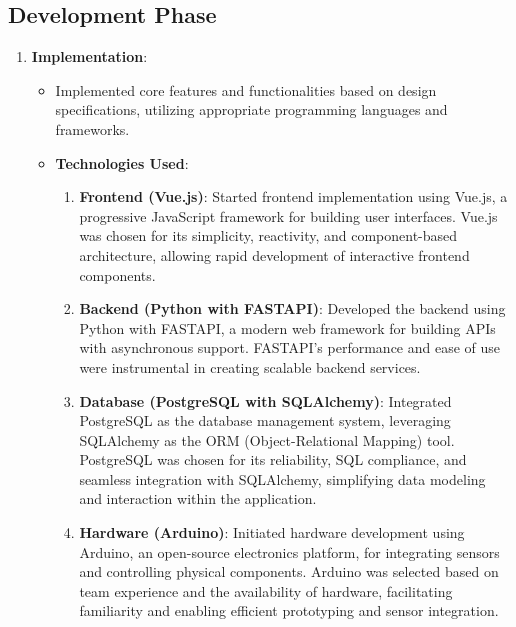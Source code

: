 \subsection{Development Phase}

\begin{enumerate}

    \item \textbf{Implementation}:
    \begin{itemize}
        \item Implemented core features and functionalities based on design specifications, utilizing appropriate programming languages and frameworks.
        \item \textbf{Technologies Used}:
            \begin{enumerate}
                \item \textbf{Frontend (Vue.js)}: Started frontend implementation using Vue.js, a progressive JavaScript framework for building user interfaces. Vue.js was chosen for its simplicity, reactivity, and component-based architecture, allowing rapid development of interactive frontend components.
                \item \textbf{Backend (Python with FASTAPI)}: Developed the backend using Python with FASTAPI, a modern web framework for building APIs with asynchronous support. FASTAPI's performance and ease of use were instrumental in creating scalable backend services.
                \item \textbf{Database (PostgreSQL with SQLAlchemy)}: Integrated PostgreSQL as the database management system, leveraging SQLAlchemy as the ORM (Object-Relational Mapping) tool. PostgreSQL was chosen for its reliability, SQL compliance, and seamless integration with SQLAlchemy, simplifying data modeling and interaction within the application.
                \item \textbf{Hardware (Arduino)}: Initiated hardware development using Arduino, an open-source electronics platform, for integrating sensors and controlling physical components. Arduino was selected based on team experience and the availability of hardware, facilitating familiarity and enabling efficient prototyping and sensor integration.
            \end{enumerate}
    \end{itemize}



\end{enumerate}

